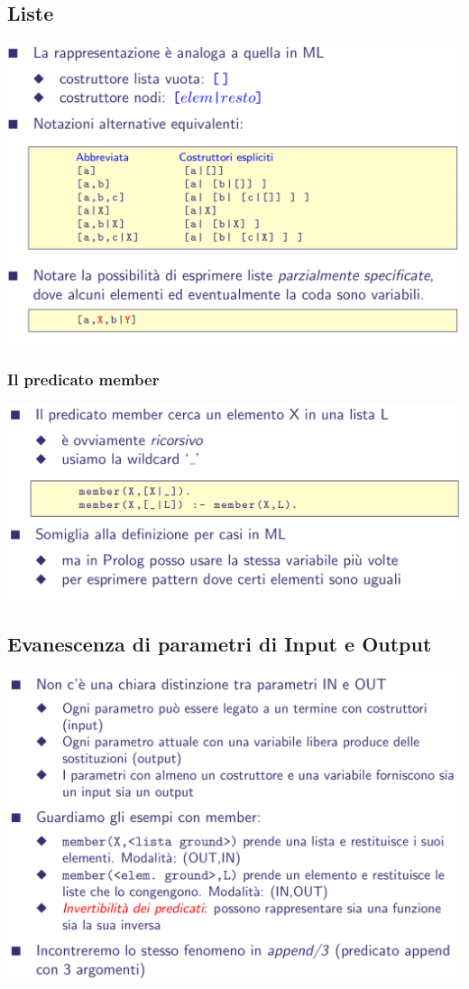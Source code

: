 \documentclass[10pt]{article}
\begin{document}
\subsection{Liste}
\includegraphics[scale=0.25]{Immagini/pl34.png}
\subsubsection{Il predicato member}
\includegraphics[scale=0.25]{Immagini/pl35.png}
\subsection{Evanescenza di parametri di Input e Output}
\includegraphics[scale=0.25]{Immagini/pl36.png}
\end{document}
